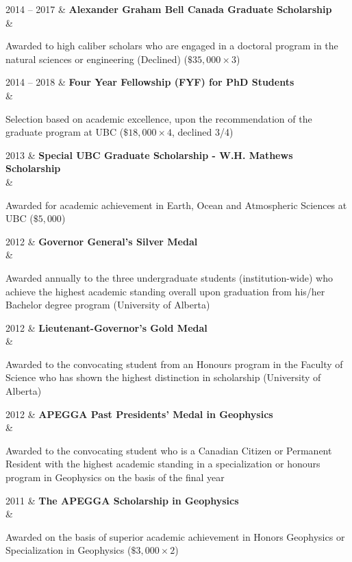 \documentclass[oneside]{cv}
\newenvironment{myquote}%
  {\list{}{\leftmargin=0.5cm\rightmargin=0cm}\item[]}%
  {\endlist}
\newcommand{\myindent}[1]{
    \begin{myquote}
    \vspace{-0.7cm}
        #1
    \vspace{-0.4cm}
    \end{myquote}
}
\begin{document}
\begin{entryright}
2014 -- 2017 & \textbf{Alexander Graham Bell Canada Graduate Scholarship} \\
& \myindent{Awarded to high caliber scholars who are engaged in a doctoral program in the natural sciences or engineering (Declined) ($ \$35,000 \times 3$)}
\end{entryright}

\begin{entryright}
2014 -- 2018 & \textbf{Four Year Fellowship (FYF) for PhD Students} \\
& \myindent{Selection based on academic excellence, upon the recommendation of the graduate program at UBC ($\$18,000 \times 4$, declined 3/4)}
\end{entryright}

\begin{entryright}
2013 & \textbf{Special UBC Graduate Scholarship - W.H. Mathews Scholarship} \\
& \myindent{Awarded for academic achievement in Earth, Ocean and Atmospheric Sciences at UBC ($\$5,000$)}
\end{entryright}

\begin{entryright}
2012 & \textbf{Governor General’s Silver Medal} \\
& \myindent{Awarded annually to the three undergraduate students (institution-wide) who achieve the highest academic standing overall upon graduation from his/her Bachelor degree program (University of Alberta)}
\end{entryright}

\begin{entryright}
2012 & \textbf{Lieutenant-Governor’s Gold Medal} \\
& \myindent{Awarded to the convocating student from an Honours program in the Faculty of Science who has shown the highest distinction in scholarship (University of Alberta)}
\end{entryright}

\begin{entryright}
2012 & \textbf{APEGGA Past Presidents’ Medal in Geophysics} \\
& \myindent{Awarded to the convocating student who is a Canadian Citizen or Permanent Resident with the highest academic standing in a specialization or honours program in Geophysics on the basis of the final year}
\end{entryright}

\begin{entryright}
2011 & \textbf{The APEGGA Scholarship in Geophysics} \\
& \myindent{Awarded on the basis of superior academic achievement in Honors Geophysics or Specialization in Geophysics ($\$3,000 \times 2$)}
\end{entryright}
\end{document}
